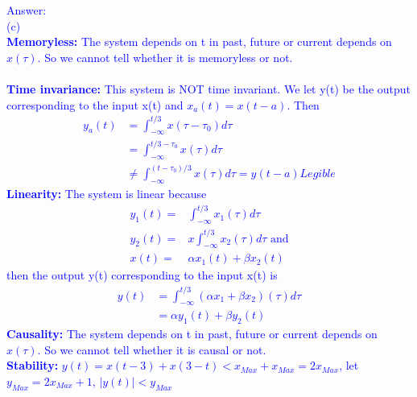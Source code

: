 \documentclass[12pt,a4paper]{article}
\begin{document}
    \begin{tcolorbox}
        \normalsize
        \textcolor{blue}{Answer:\\
        (c) \\
        \textbf{Memoryless:} The system depends on t in past, future or current depends on $x(\tau)$. So we cannot tell whether it is memoryless or not.\\ \\
        \textbf{Time invariance:} This system is NOT time invariant. We let y(t) be the output corresponding to the input x(t) and $x_a(t)=x(t-a)$. Then
        \begin{equation*}
            \begin{aligned}
                y_a(t)&=\int^{t/3}_{-\infty}x(\tau-\tau_0)d\tau\\
                &=\int^{t/3-\tau_0}_{-\infty}x(\tau)d\tau\\
                &\neq\int^{(t-\tau_0)/3}_{-\infty}x(\tau)d\tau=y(t-a)Legible
            \end{aligned}
        \end{equation*}
        \textbf{Linearity:} The system is linear because
        \begin{equation*}    
            \begin{aligned}
                y_1(t)=&\int^{t/3}_{-\infty}x_1(\tau)d\tau\\
                y_2(t)=&x\int^{t/3}_{-\infty}x_2(\tau)d\tau\text{ and}\\
                x(t)=&\alpha x_1(t)+\beta x_2(t)
            \end{aligned}
        \end{equation*}
        then the output y(t) corresponding to the input x(t) is
        \begin{equation*}
            \begin{aligned}
                y(t)&=\int^{t/3}_{-\infty}(\alpha x_1+\beta x_2)(\tau)d\tau\\
                &=\alpha y_1(t)+\beta y_2(t)
            \end{aligned}
        \end{equation*}
        \textbf{Causality:} The system depends on t in past, future or current depends on $x(\tau)$. So we cannot tell whether it is causal or not.\\
        \textbf{Stability:} $y(t)=x(t-3)+x(3-t)<x_{Max}+x_{Max}=2x_{Max}$, let $y_{Max}=2x_{Max}+1$, $|y(t)|<y_{Max}$
        }
        \end{tcolorbox}    
\end{document}
